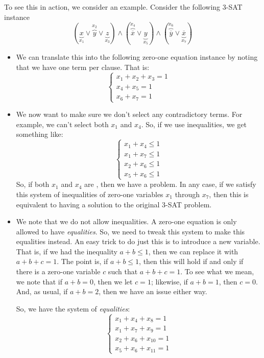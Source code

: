 \documentclass[letterpaper]{article}
\begin{document}
To see this in action, we consider an example. Consider the following 3-SAT instance 
\[(\underbrace{x}_{x_1} \lor \overbrace{y}^{x_2} \lor \underbrace{z}_{x_3}) \land (\overbrace{\overline{x}}^{x_4} \lor \underbrace{y}_{x_5}) \land (\overbrace{\overline{y}}^{x_6} \lor \underbrace{\overline{x}}_{x_7})\]
\begin{itemize}
    \item We can translate this into the following zero-one equation instance by noting that we have one term per clause. That is: 
    \[\begin{cases}
        x_1 + x_2 + x_3 = 1 \\ 
        x_4 + x_5 = 1 \\ 
        x_6 + x_7 = 1
    \end{cases}\]
    \item We now want to make sure we don't select any contradictory terms. For example, we can't select both $x_1$ and $x_4$. So, if we use inequalities, we get something like: 
    \[\begin{cases}
        x_1 + x_4 \leq 1 \\ 
        x_1 + x_7 \leq 1 \\ 
        x_2 + x_6 \leq 1 \\ 
        x_5 + x_6 \leq 1
    \end{cases}\]
    So, if both $x_1$ and $x_4$ are , then we have a problem. In any case, if we satisfy this system of inequalities of zero-one variables $x_1$ through $x_7$, then this is equivalent to having a solution to the original 3-SAT problem. 
    \item We note that we do not allow inequalities. A zero-one equation is only allowed to have \emph{equalities}. So, we need to tweak this system to make this equalities instead. An easy trick to do just this is to introduce a new variable. That is, if we had the inequality $a + b \leq 1$, then we can replace it with $a + b + c = 1$. The point is, if $a + b \leq 1$, then this will hold if and only if there is a zero-one variable $c$ such that $a + b + c = 1$. To see what we mean, we note that if $a + b = 0$, then we let $c = 1$; likewise, if $a + b = 1$, then $c = 0$. And, as usual, if $a + b = 2$, then we have an issue either way. 
    
    \bigskip 

    So, we have the system of \emph{equalities}: 
    \[\begin{cases}
        x_1 + x_4 + x_8 = 1 \\ 
        x_1 + x_7 + x_9 = 1 \\ 
        x_2 + x_6 + x_{10} = 1 \\ 
        x_5 + x_6 + x_{11} = 1
    \end{cases}\]
\end{itemize}
\end{document}
